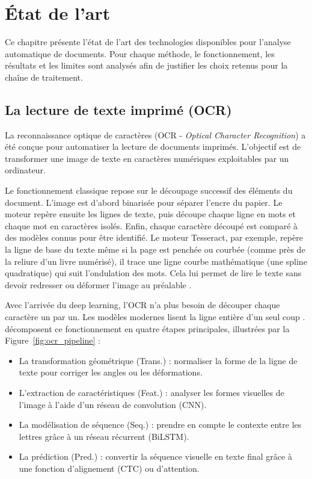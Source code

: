 
\section{État de l'art}
\label{sec:etat_art}

Ce chapitre présente l'état de l'art des technologies disponibles pour l'analyse automatique de documents. Pour chaque méthode, le fonctionnement, les résultats et les limites sont analysés afin de justifier les choix retenus pour la chaîne de traitement.

\subsection{La lecture de texte imprimé (OCR)}
\label{subsec:ocr}

La reconnaissance optique de caractères (OCR - \textit{Optical Character Recognition}) a été conçue pour automatiser la lecture de documents imprimés. L'objectif est de transformer une image de texte en caractères numériques exploitables par un ordinateur.

Le fonctionnement classique repose sur le découpage successif des éléments du document. L'image est d'abord binarisée pour séparer l'encre du papier. Le moteur repère ensuite les lignes de texte, puis découpe chaque ligne en mots et chaque mot en caractères isolés. Enfin, chaque caractère découpé est comparé à des modèles connus pour être identifié. Le moteur Tesseract, par exemple, repère la ligne de base du texte même si la page est penchée ou courbée (comme près de la reliure d'un livre numérisé), il trace une ligne courbe mathématique (une spline quadratique) qui suit l'ondulation des mots. Cela lui permet de lire le texte sans devoir redresser ou déformer l'image au préalable \citep{smith_tesseract_2007}.

Avec l'arrivée du deep learning, l'OCR n'a plus besoin de découper chaque caractère un par un. Les modèles modernes lisent la ligne entière d'un seul coup \citep{shi_crnn_2015}. \cite{baek_stract_2019} décomposent ce fonctionnement en quatre étapes principales, illustrées par la Figure~\ref{fig:ocr_pipeline} :

\begin{itemize}
  \item La transformation géométrique (Trans.) : normaliser la forme de la ligne de texte pour corriger les angles ou les déformations.
  \item L'extraction de caractéristiques (Feat.) : analyser les formes visuelles de l'image à l'aide d'un réseau de convolution (CNN).
  \item La modélisation de séquence (Seq.) : prendre en compte le contexte entre les lettres grâce à un réseau récurrent (BiLSTM).
  \item La prédiction (Pred.) : convertir la séquence visuelle en texte final grâce à une fonction d'alignement (CTC) ou d'attention.
\end{itemize}

